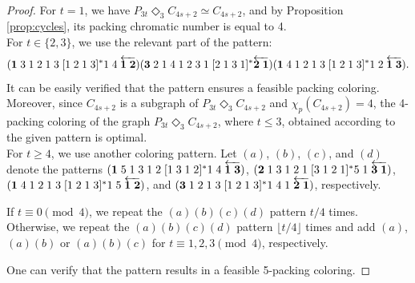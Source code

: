 \documentclass{article}
\begin{document}
\begin{proof}
    For $t = 1$, we have $P_{3t}\Diamond_{3} C_{4s+2} \simeq C_{4s+2}$, and by Proposition \ref{prop:cycles}, its packing chromatic number is equal to 4.
\\For $t\in\{2,3\}$, we use the relevant part of the pattern:
$$({\bf 1}\;3\;1\;2\;1\;3\;[1\;2\;1\;3]^*1\;4\;\overleftarrow{{\bf 1\; 2}})({\bf 3}\; 2\;1\;4\;1\;2\;3\;1\;[2\;1\;3\;1]^*\overleftarrow{{\bf 2\;1}})({\bf 1}\; 4\;1\;2\;1\;3\;[1\;2\;1\;3]^*1\;2\;\overleftarrow{{\bf 1\;3}}).$$
It can be easily verified that the pattern ensures a feasible packing coloring.
Moreover, since $C_{4s+2}$ is a subgraph of $P_{3t}\Diamond_{3} C_{4s+2}$ and $\chi_p(C_{4s+2})=4$, the 4-packing coloring of the graph $P_{3t}\Diamond_3 C_{4s+2}$, where $t \leq 3$, obtained
according to the given pattern is optimal.
\\For $t\geq 4$, we use another coloring pattern. %
Let $(a)$, $(b)$, $(c)$, and $(d)$ denote the patterns
$({\bf 1}\;5\;1\;3\;1\;2\;[1\;3\;1\;2]^*
1\;4\;\overleftarrow{{\bf 1\;3}})$, $({\bf 2}\;1\;3\;1\;2\;1\;[3\;1\;2\;1]^*
5\;1\;\overleftarrow{{\bf 3\; 1}})$, $({\bf 1}\; 4\;1\;2\;1\;3\;[1\;2\;1\;3]^*
1\;5\;\overleftarrow{{\bf 1\;2}})$, and $({\bf 3}\;1\;2\;1\;3\;[1\;2\;1\;3]^*
1\;4\;1\;\overleftarrow{{\bf 2\; 1}})$, respectively. 

If $t \equiv 0 \pmod{4}$, we repeat the $(a)(b)(c)(d)$ pattern $t/4$ times. Otherwise, we repeat the $(a)(b)(c)(d)$ pattern $\lfloor t /4 \rfloor$ times and add $(a)$, $(a)(b)$ or $(a)(b)(c)$ for $t \equiv 1, 2, 3 \pmod{4}$, respectively.

One can verify that the pattern results in a feasible 5-packing coloring.
\end{proof}
\end{document}
